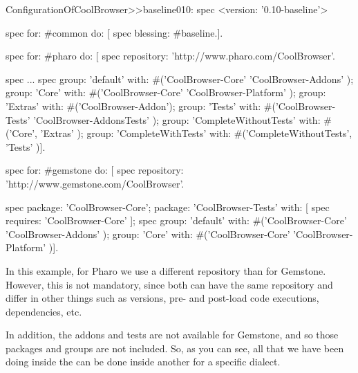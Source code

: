 \documentclass[a4paper,10pt,twoside]{book}
\begin{document}
  \begin{code}{}
 ConfigurationOfCoolBrowser>>baseline010: spec 
	<version: '0.10-baseline'>
	
	spec for: #common do: [
		spec blessing: #baseline.].
	
	spec for: #pharo do: [
		spec repository: 'http://www.pharo.com/CoolBrowser'.
		
		spec 
			...
		spec 
			group: 'default' with: #('CoolBrowser-Core' 'CoolBrowser-Addons' );
			group: 'Core' with: #('CoolBrowser-Core' 'CoolBrowser-Platform' );
			group: 'Extras' with: #('CoolBrowser-Addon');
			group: 'Tests' with: #('CoolBrowser-Tests' 'CoolBrowser-AddonsTests' );
			group: 'CompleteWithoutTests' with: #('Core', 'Extras' );
			group: 'CompleteWithTests' with: #('CompleteWithoutTests', 'Tests' )].
			
	spec for: #gemstone do: [
		spec repository: 'http://www.gemstone.com/CoolBrowser'.
		
		spec 
			package: 'CoolBrowser-Core';
			package: 'CoolBrowser-Tests' with: [ spec requires: 'CoolBrowser-Core' ];
		spec 
			group: 'default' with: #('CoolBrowser-Core' 'CoolBrowser-Addons' );
			group: 'Core' with: #('CoolBrowser-Core' 'CoolBrowser-Platform' )].			

\end{code}	
	
In this example, for Pharo we use a different repository than for Gemstone. However, this is not mandatory, since both can have the same repository and differ in other things such as versions, pre- and post-load code executions, dependencies, etc. 

In addition, the addons and tests are not available for Gemstone, and so those packages and groups are not included. So, as you can see, all that we have been doing inside the  can be done inside another  for a specific dialect. 


%
%
\end{document}
